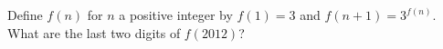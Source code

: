 Define $f (n)$ for $n$ a positive integer by $f (1) = 3$ and $f (n + 1) = 3^{f
(n)}$. What are the last two digits of $f (2012)$?
